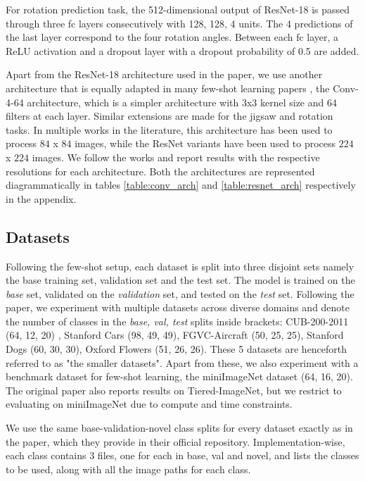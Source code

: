 For rotation prediction task, the 512-dimensional output of ResNet-18 is passed through three fc layers consecutively with {128, 128, 4} units. The 4 predictions of the last layer correspond to the four rotation angles. Between each fc layer, a ReLU activation and a dropout layer with a dropout probability of 0.5 are added.

Apart from the ResNet-18 architecture used in the paper, we use another architecture that is equally adapted in many few-shot learning papers \cite{chen2018a} \cite{protonets} \cite{sung2018learning} \cite{finn2017model}, the Conv-4-64 architecture, which is a simpler architecture with 3x3 kernel size and 64 filters at each layer. Similar extensions are made for the jigsaw and rotation tasks. In multiple works in the literature, this architecture has been used to process $84$ x $84$ images, while the ResNet variants have been used to process $224$ x $224$ images. We follow the works and report results with the respective resolutions for each architecture. Both the architectures are represented diagrammatically in tables \ref{table:conv_arch} and \ref{table:resnet_arch} respectively in the appendix.

\subsection{Datasets}

Following the few-shot setup, each dataset is split into three disjoint sets namely the base training set, validation set and the test set. The model is trained on the \textit{base} set, validated on the \textit{validation} set, and tested on the \textit{test} set.
Following the paper, we experiment with multiple datasets across diverse domains and denote the number of classes in the \textit{base, val, test} splits inside brackets: CUB-200-2011 \cite{cub}(64, 12, 20) , Stanford Cars \cite{cars} (98, 49, 49), FGVC-Aircraft \cite{aircrafts} (50, 25, 25), Stanford Dogs \cite{dogs} (60, 30, 30), Oxford Flowers \cite{flowers} (51, 26, 26). These 5 datasets are henceforth referred to as "the smaller datasets". Apart from these, we also experiment with a benchmark dataset for few-shot learning, the miniImageNet dataset \cite{mini} (64, 16, 20). The original paper also reports results on Tiered-ImageNet, but we restrict to evaluating on miniImageNet due to compute and time constraints. 

We use the same base-validation-novel class splits for every dataset exactly as in the paper, which they provide in their official repository. Implementation-wise, each class contains $3$ files, one for each in base, val and novel, and lists the classes to be used, along with all the image paths for each class.

